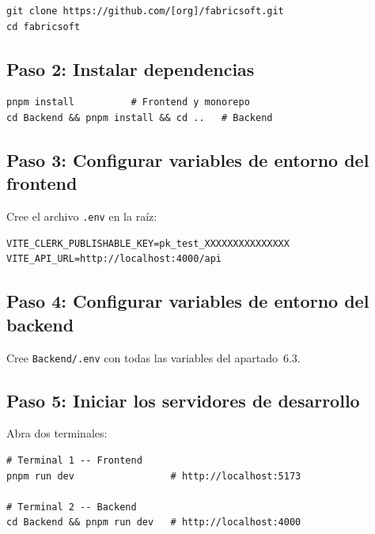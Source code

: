 \documentclass[12pt, a4paper, twoside]{report}
\begin{document}
\begin{tcolorbox}[codebox]
\begin{lstlisting}[style=bash, numbers=none]
git clone https://github.com/[org]/fabricsoft.git
cd fabricsoft
\end{lstlisting}
\end{tcolorbox}

\subsection*{Paso 2: Instalar dependencias}

\begin{tcolorbox}[codebox]
\begin{lstlisting}[style=bash, numbers=none]
pnpm install          # Frontend y monorepo
cd Backend && pnpm install && cd ..   # Backend
\end{lstlisting}
\end{tcolorbox}

\subsection*{Paso 3: Configurar variables de entorno del frontend}

Cree el archivo \texttt{.env} en la raíz:

\begin{tcolorbox}[codebox]
\begin{lstlisting}[style=env, numbers=none]
VITE_CLERK_PUBLISHABLE_KEY=pk_test_XXXXXXXXXXXXXXX
VITE_API_URL=http://localhost:4000/api
\end{lstlisting}
\end{tcolorbox}

\subsection*{Paso 4: Configurar variables de entorno del backend}

Cree \texttt{Backend/.env} con todas las variables del apartado~6.3.

\subsection*{Paso 5: Iniciar los servidores de desarrollo}

Abra dos terminales:

\begin{tcolorbox}[codebox]
\begin{lstlisting}[style=bash, numbers=none]
# Terminal 1 -- Frontend
pnpm run dev                 # http://localhost:5173

# Terminal 2 -- Backend
cd Backend && pnpm run dev   # http://localhost:4000
\end{lstlisting}
\end{tcolorbox}
\end{document}
